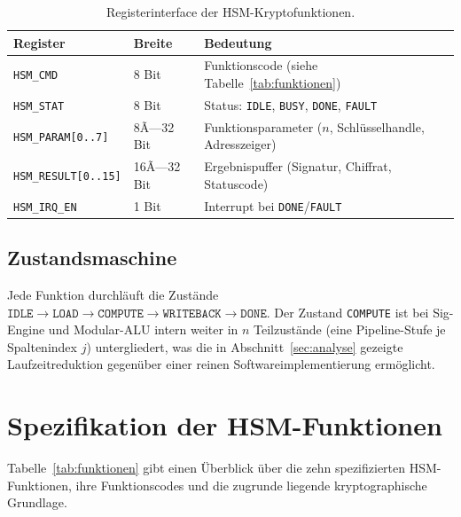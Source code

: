 ﻿\documentclass[a4paper,12pt]{article}
\theoremstyle{definition}
\begin{document}
\begin{table}[h]
	\centering
	\small
	\begin{tabular}{@{}lll@{}}
		\toprule
		Register & Breite & Bedeutung \\
		\midrule
		\texttt{HSM\_CMD} & 8 Bit & Funktionscode (siehe Tabelle~\ref{tab:funktionen}) \\
		\texttt{HSM\_STAT} & 8 Bit & Status: \texttt{IDLE}, \texttt{BUSY}, \texttt{DONE}, \texttt{FAULT} \\
		\texttt{HSM\_PARAM[0..7]} & 8Ã—32 Bit & Funktionsparameter ($n$, Schlüsselhandle, Adresszeiger) \\
		\texttt{HSM\_RESULT[0..15]} & 16Ã—32 Bit & Ergebnispuffer (Signatur, Chiffrat, Statuscode) \\
		\texttt{HSM\_IRQ\_EN} & 1 Bit & Interrupt bei \texttt{DONE}/\texttt{FAULT} \\
		\bottomrule
	\end{tabular}
	\caption{Registerinterface der HSM-Kryptofunktionen.}
	\label{tab:register}
\end{table}

\subsection{Zustandsmaschine}

Jede Funktion durchläuft die Zustände $\texttt{IDLE} \to \texttt{LOAD} \to \texttt{COMPUTE} \to \texttt{WRITEBACK} \to \texttt{DONE}$. Der Zustand \texttt{COMPUTE} ist bei Sig-Engine und Modular-ALU intern weiter in $n$ Teilzustände (eine Pipeline-Stufe je Spaltenindex $j$) untergliedert, was die in Abschnitt~\ref{sec:analyse} gezeigte Laufzeitreduktion gegenüber einer reinen Softwareimplementierung ermöglicht.

\section{Spezifikation der HSM-Funktionen}
\label{sec:funktionen}

Tabelle~\ref{tab:funktionen} gibt einen Überblick über die zehn spezifizierten HSM-Funktionen, ihre Funktionscodes und die zugrunde liegende kryptographische Grundlage.
\end{document}
